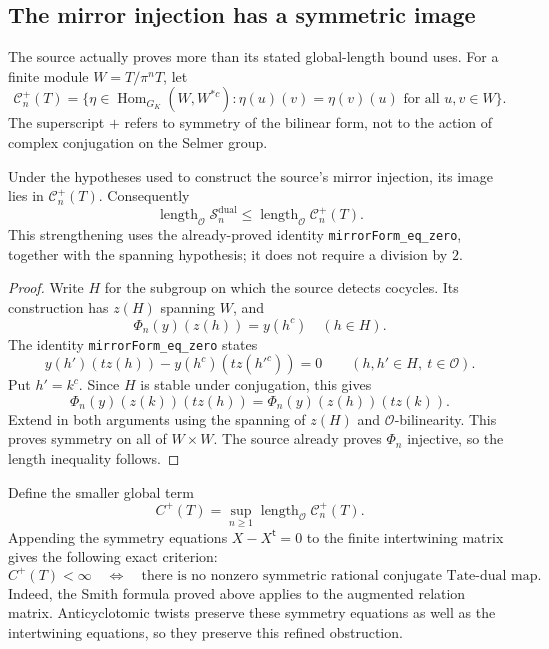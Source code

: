 \subsection{The mirror injection has a symmetric image}
\label{sec:symmetric-mirror}

The source actually proves more than its stated global-length bound uses.
For a finite module $W=T/\pi^nT$, let
\[
 \mathcal C_n^+(T)=
 \{\eta\in\operatorname{Hom}_{G_K}(W,W^{*c}):
          \eta(u)(v)=\eta(v)(u)\text{ for all }u,v\in W\}.
\]
The superscript $+$ refers to symmetry of the bilinear form, not to the
action of complex conjugation on the Selmer group.

\begin{proposition}
\label{prop:symmetric-mirror}
Under the hypotheses used to construct the source's mirror injection,
its image lies in $\mathcal C_n^+(T)$.  Consequently
\[
 \operatorname{length}_{\mathcal O}\mathcal S_n^{\mathrm{dual}}
 \le\operatorname{length}_{\mathcal O}\mathcal C_n^+(T).
\]
This strengthening uses the already-proved identity
\texttt{mirrorForm\_eq\_zero}, together with the spanning hypothesis;
it does not require a division by $2$.
\end{proposition}
\begin{proof}
Write $H$ for the subgroup on which the source detects cocycles.
Its construction has $z(H)$ spanning $W$, and
\[
 \Phi_n(y)(z(h))=y(h^c)\quad(h\in H).
\]
The identity \texttt{mirrorForm\_eq\_zero} states
\[
 y(h')(t z(h))-y(h^c)(t z(h'^c))=0
 \qquad(h,h'\in H,\ t\in\mathcal O).
\]
Put $h'=k^c$.  Since $H$ is stable under conjugation, this gives
\[
 \Phi_n(y)(z(k))(t z(h))
 =\Phi_n(y)(z(h))(t z(k)).
\]
Extend in both arguments using the spanning of $z(H)$ and
$\mathcal O$-bilinearity.  This proves symmetry on all of $W\times W$.
The source already proves $\Phi_n$ injective, so the length inequality
follows.
\end{proof}

Define the smaller global term
\[
 C^+(T)=\sup_{n\ge1}\operatorname{length}_{\mathcal O}\mathcal C_n^+(T).
\]
Appending the symmetry equations $X-X^{\mathsf t}=0$ to the finite
intertwining matrix gives the following exact criterion:
\[
 C^+(T)<\infty
 \quad\Longleftrightarrow\quad
 \text{there is no nonzero symmetric rational conjugate Tate-dual map.}
\]
Indeed, the Smith formula proved above applies to the augmented relation
matrix.  Anticyclotomic twists preserve these symmetry equations as well
as the intertwining equations, so they preserve this refined obstruction.

